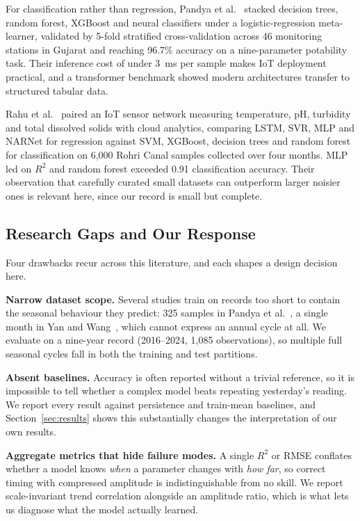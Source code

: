\documentclass[conference]{IEEEtran}
\begin{document}
For classification rather than regression, Pandya et al.~\cite{pandya} stacked
decision trees, random forest, XGBoost and neural classifiers under a
logistic-regression meta-learner, validated by 5-fold stratified
cross-validation across 46 monitoring stations in Gujarat and reaching 96.7\%
accuracy on a nine-parameter potability task. Their inference cost of under
3~ms per sample makes IoT deployment practical, and a transformer benchmark
showed modern architectures transfer to structured tabular data.

Rahu et al.~\cite{rahu} paired an IoT sensor network measuring temperature, pH,
turbidity and total dissolved solids with cloud analytics, comparing LSTM, SVR,
MLP and NARNet for regression against SVM, XGBoost, decision trees and random
forest for classification on 6{,}000 Rohri Canal samples collected over four
months. MLP led on $R^2$ and random forest exceeded 0.91 classification
accuracy. Their observation that carefully curated small datasets can
outperform larger noisier ones is relevant here, since our record is small but
complete.

\subsection{Research Gaps and Our Response}

Four drawbacks recur across this literature, and each shapes a design decision
here.

\textbf{Narrow dataset scope.} Several studies train on records too short to
contain the seasonal behaviour they predict: 325 samples in Pandya et
al.~\cite{pandya}, a single month in Yan and Wang~\cite{yan}, which cannot
express an annual cycle at all. We evaluate on a nine-year record (2016--2024,
1{,}085 observations), so multiple full seasonal cycles fall in both the
training and test partitions.

\textbf{Absent baselines.} Accuracy is often reported without a trivial
reference, so it is impossible to tell whether a complex model beats repeating
yesterday's reading. We report every result against persistence and train-mean
baselines, and Section~\ref{sec:results} shows this substantially changes the
interpretation of our own results.

\textbf{Aggregate metrics that hide failure modes.} A single $R^2$ or RMSE
conflates whether a model knows \emph{when} a parameter changes with \emph{how
far}, so correct timing with compressed amplitude is indistinguishable from no
skill. We report scale-invariant trend correlation alongside an amplitude
ratio, which is what lets us diagnose what the model actually learned.
\end{document}

